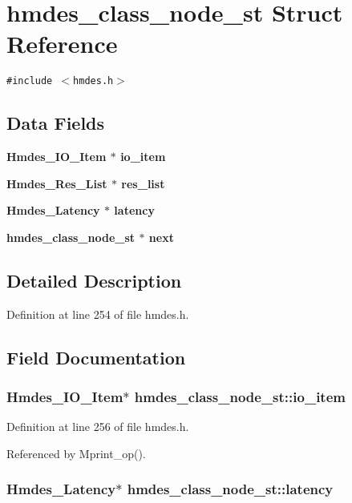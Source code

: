 \section{hmdes\_\-class\_\-node\_\-st Struct Reference}
\label{structhmdes__class__node__st}
{\tt \#include $<$hmdes.h$>$}

\subsection*{Data Fields}
\begin{CompactItemize}
\item 
\bf{Hmdes\_\-IO\_\-Item} $\ast$ \bf{io\_\-item}
\item 
\bf{Hmdes\_\-Res\_\-List} $\ast$ \bf{res\_\-list}
\item 
\bf{Hmdes\_\-Latency} $\ast$ \bf{latency}
\item 
\bf{hmdes\_\-class\_\-node\_\-st} $\ast$ \bf{next}
\end{CompactItemize}


\subsection{Detailed Description}




Definition at line 254 of file hmdes.h.

\subsection{Field Documentation}
\subsubsection{\setlength{\rightskip}{0pt plus 5cm}\bf{Hmdes\_\-IO\_\-Item}$\ast$ \bf{hmdes\_\-class\_\-node\_\-st::io\_\-item}}\label{structhmdes__class__node__st_e87968a8c806d06fecee0f8fa8190c17}




Definition at line 256 of file hmdes.h.

Referenced by Mprint\_\-op().
\subsubsection{\setlength{\rightskip}{0pt plus 5cm}\bf{Hmdes\_\-Latency}$\ast$ \bf{hmdes\_\-class\_\-node\_\-st::latency}}\label{structhmdes__class__node__st_14db391f2f28c8230bea429d32f23aa0}





